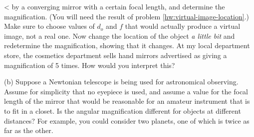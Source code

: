 <%
by a converging mirror with a certain focal length, and
determine the magnification. (You will need the result of
problem \ref{hw:virtual-image-location}.) Make sure to choose values of $d_o$ and $f$ that
would actually produce a virtual image, not a real one. Now
change the location of the object \emph{a little bit} and
redetermine the magnification, showing that it changes. At
my local department store, the cosmetics department sells
hand mirrors advertised as giving a magnification of 5 times. How
would you interpret this?

(b) Suppose a Newtonian telescope is being used for
astronomical observing. Assume for simplicity that no
eyepiece is used, and assume a value for the focal length of
the mirror that would be reasonable for an amateur
instrument that is to fit in a closet. Is the angular
magnification different for objects at different distances?
For example, you could consider two planets, one of which is
twice as far as the other.

